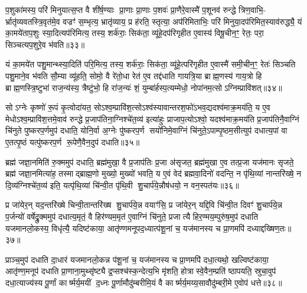 प॒शुका॑मस्य॒ परि॑ मिनुयात्स॒प्त वै शी॑र्\mbox{}ष॒ण्याः प्रा॒णाः प्रा॒णाः प॒शवः॑ प्रा॒णैरे॒वास्मै॑ प॒शूनव॑ रुन्द्धे त्रिण॒वाभि॒- र्भ्रातृ॑व्यवतस्त्रि॒वृत॑मे॒व वज्रꣳ॑ स॒म्भृत्य॒ भ्रातृ॑व्याय॒ प्र ह॑रति॒ स्तृत्या॒ अप॑रिमिताभिः॒ परि॑ मिनुया॒दप॑रिमित॒स्याव॑रुद्ध्यै॒ यं का॒मये॑ताप॒शुः स्या॒दित्यप॑रिमित्य॒ तस्य॒ शर्क॑राः॒ सिक॑ता॒ व्यू॑हे॒दप॑रिगृहीत ए॒वास्य॑ विषू॒चीन॒ꣳ॒ रेतः॒ परा॒ सिञ्चत्यप॒शुरे॒व भ॑वति॥३३॥

यं का॒मये॑त पशु॒मान्थ्स्या॒दिति॑ परि॒मित्य॒ तस्य॒ शर्क॑राः॒ सिक॑ता॒ व्यू॑हे॒त्परि॑गृहीत ए॒वास्मै॑ समी॒चीन॒ꣳ॒ रेतः॑ सिञ्चति पशु॒माने॒व भ॑वति सौ॒म्या व्यू॑हति॒ सोमो॒ वै रे॑तो॒धा रेत॑ ए॒व तद्द॑धाति गायत्रि॒या ब्राह्म॒णस्य॑ गाय॒त्रो हि ब्राह्म॒णस्त्रि॒ष्टुभा॑ राज॒न्य॑स्य॒ त्रैष्टु॑भो॒ हि रा॑ज॒न्यः॑ शं॒ युम्बा॑र्\mbox{}हस्प॒त्यम्मेधो॒ नोपा॑नम॒त्सोऽग्निम्प्रावि॑शत्॥३४॥

सोऽग्नेः कृष्णो॑ रू॒पं कृ॒त्वोदा॑यत॒ सोऽश्व॒म्प्रावि॑श॒त्सोऽश्व॑स्यावान्तरश॒फो॑ऽभव॒द्यदश्व॑माक्र॒मय॑ति॒ य ए॒व मेधोऽश्व॒म्प्रावि॑श॒त्तमे॒वाव॑ रुन्द्धे प्र॒जाप॑तिना॒ग्निश्चे॑त॒व्य॑ इत्या॑हुः प्राजाप॒त्योऽश्वो॒ यदश्व॑माक्र॒मय॑ति प्र॒जाप॑तिनै॒वाग्निं चि॑नुते पुष्करप॒र्णमुप॑ दधाति॒ योनि॒र्वा अ॒ग्नेः पु॑ष्करप॒र्ण सयो॑निमे॒वाग्निं चि॑नुते॒ऽपाम्पृ॒ष्ठम॒सीत्युप॑ दधात्य॒पां वा ए॒तत्पृ॒ष्ठं यत्पु॑ष्करप॒र्ण रू॒पेणै॒वैन॒दुप॑ दधाति॥३५॥

{\anuvakamend[{इन्द्रः॑ प॒शुका॑मस्य भवत्यविश॒थ्सयो॑निं विश॒तिश्च॑॥६॥}]}

ब्रह्म॑ जज्ञा॒नमिति॑ रु॒क्ममुप॑ दधाति॒ ब्रह्म॑मुखा॒ वै प्र॒जाप॑तिः प्र॒जा अ॑सृजत॒ ब्रह्म॑मुखा ए॒व तत्प्र॒जा यज॑मानः सृजते॒ ब्रह्म॑ जज्ञा॒नमित्या॑ह॒ तस्माद्ब्राह्म॒णो मुख्यो॒ मुख्यो॑ भवति॒ य ए॒वं वेद॑ ब्रह्मवा॒दिनो॑ वदन्ति॒ न पृ॑थि॒व्यां नान्तरि॑ख्षे॒ न दि॒व्य॑ग्निश्चे॑त॒व्य॑ इति॒ यत्पृ॑थि॒व्यां चि॑न्वी॒त पृ॑थि॒वी शु॒चार्प॑ये॒न्नौष॑धयो॒ न वन॒स्पत॑यः॥३६॥

प्र जा॑येर॒न् यद॒न्तरि॑ख्षे चिन्वी॒तान्तरि॑ख्ष शु॒चार्प॑ये॒न्न वयाꣳ॑सि॒ प्र जा॑येर॒न् यद्दि॒वि चि॑न्वी॒त दिवꣳ॑ शु॒चार्प॑ये॒न्न प॒र्जन्यो॑ वर्\mbox{}षेद्रु॒क्ममुप॑ दधात्य॒मृतं॒ वै हिर॑ण्यम॒मृत॑ ए॒वाग्निं चि॑नुते॒ प्रजात्यै हिर॒ण्मय॒म्पुरु॑ष॒मुप॑ दधाति यजमानलो॒कस्य॒ विधृ॑त्यै॒ यदिष्ट॑काया॒ आतृ॑ण्णमनूपद॒ध्यात्प॑शू॒नां च॒ यज॑मानस्य च प्रा॒णमपि॑ दध्याद्दख्षिण॒तः॥३७॥

प्राञ्च॒मुप॑ दधाति दा॒धार॑ यजमानलो॒कन्न प॑शू॒नां च॒ यज॑मानस्य च प्रा॒णमपि॑ दधा॒त्यथो॒ खल्विष्ट॑काया॒ आतृ॑ण्ण॒मनूप॑ दधाति प्रा॒णाना॒मुथ्सृ॑ष्ट्यै द्र॒प्सश्च॑स्क॒न्देत्य॒भि मृ॑शति॒ होत्रास्वे॒वैन॒म्प्रति॑ ष्ठापयति॒ स्रुचा॒वुप॑ दधा॒त्याज्य॑स्य पू॒र्णां कार्ष्मर्य॒मयीं द॒ध्नः पू॒र्णामौदु॑म्बरीमि॒यं वै कार्ष्मर्य॒मय्य॒सावौदु॑म्बरी॒मे ए॒वोप॑ धत्ते॥३८॥

